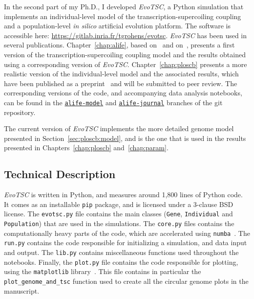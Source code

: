In the second part of my Ph.D., I developed \emph{EvoTSC}, a Python simulation that implements an individual-level model of the transcription-supercoiling coupling and a population-level \emph{in silico} artificial evolution platform.
The software is accessible here: \url{https://gitlab.inria.fr/tgrohens/evotsc}.
\emph{EvoTSC} has been used in several publications.
Chapter~\ref{chap:alife}, based on~\cite{grohens2021} and on~\cite{grohens2022a}, presents a first version of the transcription-supercoiling coupling model and the results obtained using a corresponding version of \emph{EvoTSC}.
Chapter~\ref{chap:ploscb} presents a more realistic version of the individual-level model and the associated results, which have been published as a preprint~\citep{grohens2022b} and will be submitted to peer review.
The corresponding versions of the code, and accompanying data analysis notebooks, can be found in the \href{https://gitlab.inria.fr/tgrohens/evotsc/-/tree/alife-model}{\texttt{alife-model}} \citep{grohens2021} and \href{https://gitlab.inria.fr/tgrohens/evotsc/-/tree/alife-journal}{\texttt{alife-journal}} \citep{grohens2022a} branches of the git repository.

The current version of \emph{EvoTSC} implements the more detailed genome model presented in Section~\ref{sec:ploscb:model}, and is the one that is used in the results presented in Chapters~\ref{chap:ploscb} and~\ref{chap:param}.

\subsection{Technical Description}

\emph{EvoTSC} is written in Python, and measures around 1,800 lines of Python code.
It comes as an installable \texttt{pip} package, and is licensed under a 3-clause BSD license.
The \texttt{evotsc.py} file contains the main classes (\texttt{Gene}, \texttt{Individual} and \texttt{Population}) that are used in the simulations.
The \texttt{core.py} files contains the computationally heavy parts of the code, which are accelerated using \texttt{numba}~\citep{lam2015}.
The \texttt{run.py} contains the code responsible for initializing a simulation, and data input and output.
The \texttt{lib.py} contains miscellaneous functions used throughout the notebooks.
Finally, the \texttt{plot.py} file contains the code responsible for plotting, using the \texttt{matplotlib} library~\citep{hunter2007}.
This file contains in particular the \texttt{plot\_genome\_and\_tsc} function used to create all the circular genome plots in the manuscript.


